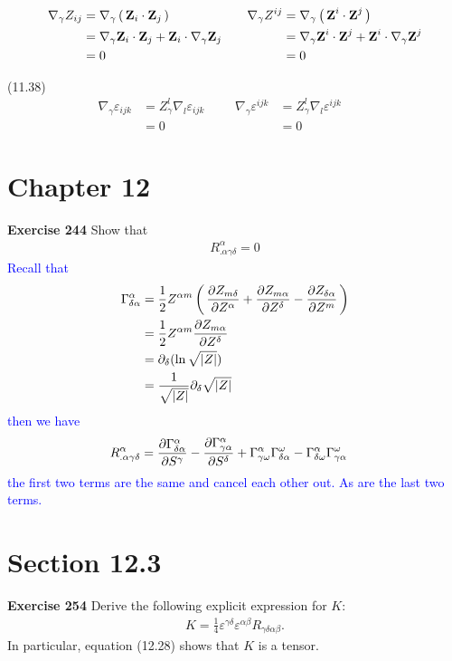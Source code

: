 \documentclass[12pt,a4paper]{report}
\newcommand{\BLUE}[1]{\textcolor{blue}{#1}}
\newcommand{\COFFF}[3]{\frac{1}{2}Z^{{#1}m}\PAREN{\PART{Z_{m{#2}}}{Z^{#3}} + \PART{Z_{m{#3}}}{Z^{#2}} - \PART{Z_{{#2}{#3}}}{Z^m}}}
\newcommand{\RIEMANN}[4]{ \PART{\Gamma^#1_{#4#2}}{S^#3} - \PART{\Gamma^#1_{#3#2}}{S^#4} + \Gamma^#1_{#3\omega}\Gamma^\omega_{#4#2} - \Gamma^#1_{#4\omega}\Gamma^{\omega}_{#3#2}}
\begin{document}
{\begin{description}
	\begin{align*}
		\nabla_\gamma Z_{ij} &= \nabla_\gamma \left (\, \textbf{Z}_i \cdot \textbf{Z}_j \,\right ) & && \nabla_\gamma Z^{ij} &= \nabla_\gamma \left (\, \textbf{Z}^i \cdot \textbf{Z}^j \,\right ) \\
		&= \nabla_\gamma \textbf{Z}_i \cdot \textbf{Z}_j + \textbf{Z}_i \cdot \nabla_\gamma \textbf{Z}_j & && &= \nabla_\gamma \textbf{Z}^i \cdot \textbf{Z}^j + \textbf{Z}^i \cdot \nabla_\gamma \textbf{Z}^j \\
		&= 0 & && &= 0
	\end{align*}
	\item (11.38)
	\begin{align*}
		\nabla_\gamma\varepsilon_{ijk} &= Z_\gamma^l \nabla_l \varepsilon_{ijk} &
		&& \nabla_\gamma\varepsilon^{ijk} &= Z_\gamma^l \nabla_l \varepsilon^{ijk} & && \\
		&= 0 & && &= 0
	\end{align*}
\end{description}
}

\section*{Chapter 12}
\textbf{Exercise 244} Show that
\begin{align*}
	R^\alpha_{.\alpha\gamma\delta} = 0
\end{align*}
\BLUE{Recall that 
\begin{align*}
	\Gamma^\alpha_{\delta\alpha} &= \COFFF{\alpha}{\delta}{\alpha} \\
		&= \frac{1}{2}Z^{\alpha m}\PART{Z_{m\alpha}}{Z^\delta} \\
		&= \partial_\delta (\ln \sqrt{|Z|}) \\
		&= \frac{1}{\sqrt{|Z|}} \partial_\delta \sqrt{|Z|}
\end{align*}then we have
\begin{align*}
	R^\alpha_{.\alpha\gamma\delta} &= \RIEMANN{\alpha}{\alpha}{\gamma}{\delta}
\end{align*}the first two terms are the same and cancel each other out.  As are the last two terms.
}


\section*{Section 12.3}
\textbf{Exercise 254} Derive the following explicit expression for $K$:
\begin{align*}
	K = \frac{1}{4}\varepsilon^{\gamma\delta}\varepsilon^{\alpha\beta} R_{\gamma\delta\alpha\beta}.
\end{align*}In particular, equation (12.28) shows that $K$ is a tensor.
\end{document}
